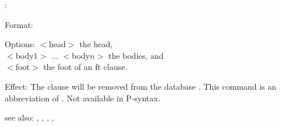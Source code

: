 \rxft:

Format: 

Options: $<$head$>$ the head,\\
	 $<$body$1>$ ... $<$body$n>$ the bodies, and\\
	 $<$foot$>$ the foot of an ft clause.

Effect: The clause 
        will be removed 
	from the database .
	This command is an abbreviation of 
        .
        Not available in P-syntax.

see also: \rx, \rxhn, \consult, \destroy, \replace
